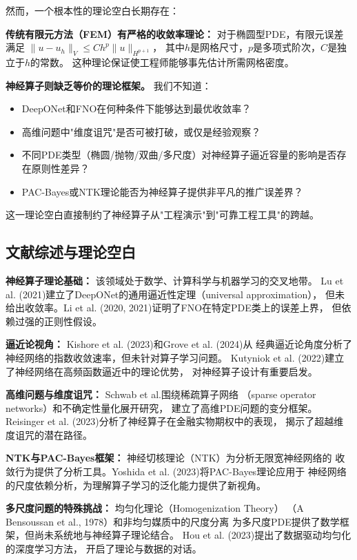 \documentclass[12pt,a4paper,twoside]{article}
\begin{document}
然而，一个根本性的理论空白长期存在：

\textbf{传统有限元方法（FEM）有严格的收敛率理论：}
对于椭圆型PDE，有限元误差满足 $\|u-u_h\|_V \leq C h^p \|u\|_{H^{p+1}}$，
其中$h$是网格尺寸，$p$是多项式阶次，$C$是独立于$h$的常数。
这种理论保证使工程师能够事先估计所需网格密度。

\textbf{神经算子则缺乏等价的理论框架。}
我们不知道：
\begin{itemize}
    \item DeepONet和FNO在何种条件下能够达到最优收敛率？
    \item 高维问题中"维度诅咒"是否可被打破，或仅是经验观察？
    \item 不同PDE类型（椭圆/抛物/双曲/多尺度）对神经算子逼近容量的影响是否存在原则性差异？
    \item PAC-Bayes或NTK理论能否为神经算子提供非平凡的推广误差界？
\end{itemize}

这一理论空白直接制约了神经算子从"工程演示"到"可靠工程工具"的跨越。

\subsection{文献综述与理论空白}

\textbf{神经算子理论基础：} 该领域处于数学、计算科学与机器学习的交叉地带。
Lu et al. (2021)建立了DeepONet的通用逼近性定理（universal approximation），
但未给出收敛率。Li et al. (2020, 2021)证明了FNO在特定PDE类上的误差上界，
但依赖过强的正则性假设。

\textbf{逼近论视角：} Kishore et al. (2023)和Grove et al. (2024)从
经典逼近论角度分析了神经网络的指数收敛速率，但未针对算子学习问题。
Kutyniok et al. (2022)建立了神经网络在高频函数逼近中的理论优势，
对神经算子设计有重要启发。

\textbf{高维问题与维度诅咒：} Schwab et al.围绕稀疏算子网络
（sparse operator networks）和不确定性量化展开研究，
建立了高维PDE问题的变分框架。
Reisinger et al. (2023)分析了神经算子在金融实物期权中的表现，
揭示了超越维度诅咒的潜在路径。

\textbf{NTK与PAC-Bayes框架：} 神经切核理论（NTK）为分析无限宽神经网络的
收敛行为提供了分析工具。Yoshida et al. (2023)将PAC-Bayes理论应用于
神经网络的尺度依赖分析，为理解算子学习的泛化能力提供了新视角。

\textbf{多尺度问题的特殊挑战：} 均匀化理论（Homogenization Theory）
（A Bensoussan et al., 1978）和非均匀媒质中的尺度分离
为多尺度PDE提供了数学框架，但尚未系统地与神经算子理论结合。
Hou et al. (2023)提出了数据驱动均匀化的深度学习方法，
开启了理论与数据的对话。
\end{document}
